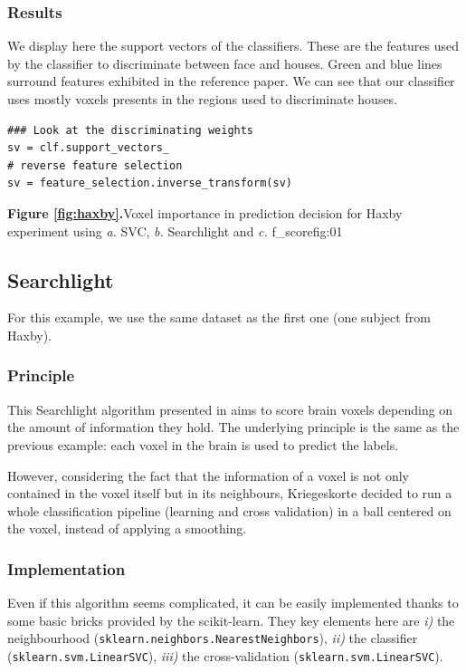 \documentclass{frontiersSCNS} %
\begin{document}
\subsubsection{Results}

We display here the support vectors of the classifiers. These are the features
used by the classifier to discriminate between face and houses. Green and blue
lines surround features exhibited in the reference paper. We can see that our
classifier uses mostly voxels presents in the regions used to discriminate
houses.

\begin{lstlisting}
### Look at the discriminating weights
sv = clf.support_vectors_
# reverse feature selection
sv = feature_selection.inverse_transform(sv)
\end{lstlisting}

\textbf{Figure \ref{fig:haxby}.}{Voxel importance in prediction decision for Haxby experiment
using \textit{a.} SVC, \textit{b.} Searchlight and \textit{c.} f\_score}{fig:01}

\subsection{Searchlight}
\label{searchlight}
For this example, we use the same dataset as the first one (one subject from
Haxby).

\subsubsection{Principle}

This Searchlight algorithm presented in \cite{kriegeskorte2006} aims to score
brain voxels depending on the amount of information they hold. The underlying
principle is the same as the previous example: each voxel in the brain is used
to predict the labels.

However, considering the fact that the information of a voxel is not only
contained in the voxel itself but in its neighbours, Kriegeskorte decided to run
a whole classification pipeline (learning and cross validation) in a ball
centered on the voxel, instead of applying a smoothing.

\subsubsection{Implementation}

Even if this algorithm seems complicated, it can be easily implemented thanks to
some basic bricks provided by the scikit-learn. They key elements here are
\textit{i)} the neighbourhood (\texttt{sklearn.neighbors.NearestNeighbors}),
\textit{ii)} the classifier (\texttt{sklearn.svm.LinearSVC}),
\textit{iii)} the cross-validation (\texttt{sklearn.svm.LinearSVC}).
\end{document}
